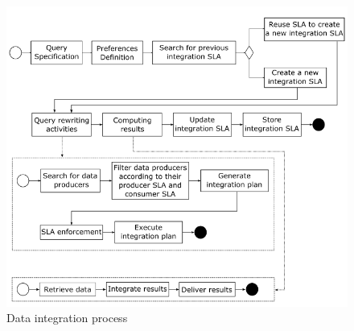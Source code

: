 \begin{figure}[h!]
\center
\includegraphics[scale=0.50]{process.png}
\caption{Data integration process}\label{fig:process}
\end{figure}


